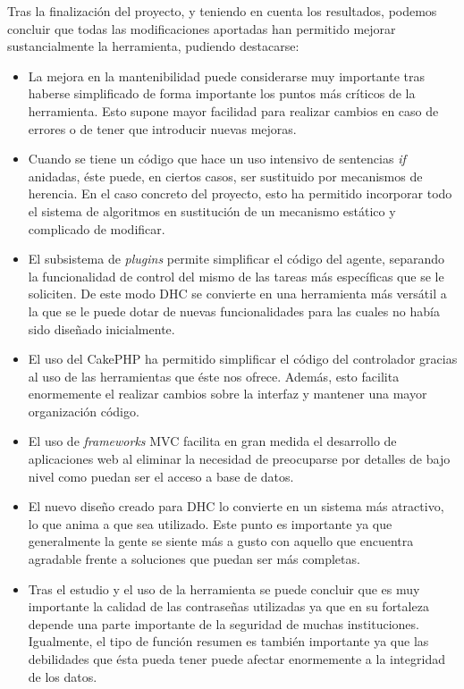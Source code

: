 Tras la finalización del proyecto, y teniendo en cuenta los resultados, podemos concluir que todas las modificaciones aportadas han permitido mejorar sustancialmente la herramienta, pudiendo destacarse:

\begin{itemize}
	\item La mejora en la mantenibilidad puede considerarse muy importante tras haberse simplificado de forma importante los puntos más críticos de la herramienta. Esto supone mayor facilidad para realizar cambios en caso de errores o de tener que introducir nuevas mejoras.
	
	\item Cuando se tiene un código que hace un uso intensivo de sentencias \emph{if} anidadas, éste puede, en ciertos casos, ser sustituido por mecanismos de herencia. En el caso concreto del proyecto, esto ha permitido incorporar todo el sistema de algoritmos en sustitución de un mecanismo estático y complicado de modificar.
	
	\item El subsistema de \emph{plugins} permite simplificar el código del agente, separando la funcionalidad de control del mismo de las tareas más específicas que se le soliciten. De este modo DHC se convierte en una herramienta más versátil a la que se le puede dotar de nuevas funcionalidades para las cuales no había sido diseñado inicialmente.
	
	\item El uso del CakePHP ha permitido simplificar el código del controlador gracias al uso de las herramientas que éste nos ofrece. Además, esto facilita enormemente el realizar cambios sobre la interfaz y mantener una mayor organización código.
	
	\item El uso de \emph{frameworks} MVC facilita en gran medida el desarrollo de aplicaciones web al eliminar la necesidad de preocuparse por detalles de bajo nivel como puedan ser el acceso a base de datos.

	\item El nuevo diseño creado para DHC lo convierte en un sistema más atractivo, lo que anima a que sea utilizado. Este punto es importante ya que generalmente la gente se siente más a gusto con aquello que encuentra agradable frente a soluciones que puedan ser más completas.
	
	\item Tras el estudio y el uso de la herramienta se puede concluir que es muy importante la calidad de las contraseñas utilizadas ya que en su fortaleza depende una parte importante de la seguridad de muchas instituciones. Igualmente, el tipo de función resumen es también importante ya que las debilidades que ésta pueda tener puede afectar enormemente a la integridad de los datos.
		

\end{itemize}
